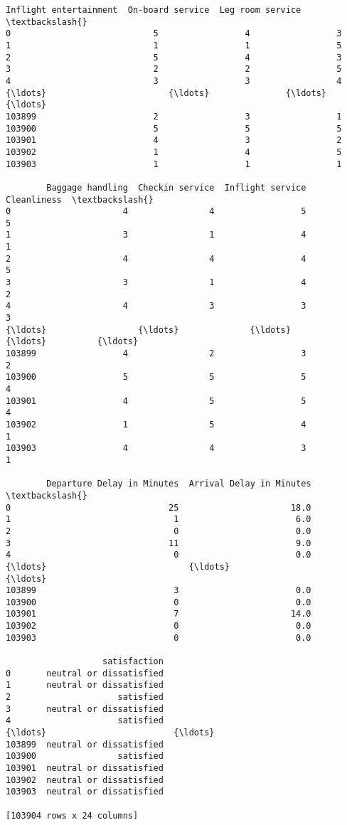 \documentclass[11pt]{article}
\begin{document}
\begin{tcolorbox}[breakable, size=fbox, boxrule=.5pt, pad at break*=1mm, opacityfill=0]
\begin{Verbatim}[commandchars=\\\{\}]
        Inflight entertainment  On-board service  Leg room service  \textbackslash{}
0                            5                 4                 3
1                            1                 1                 5
2                            5                 4                 3
3                            2                 2                 5
4                            3                 3                 4
{\ldots}                        {\ldots}               {\ldots}               {\ldots}
103899                       2                 3                 1
103900                       5                 5                 5
103901                       4                 3                 2
103902                       1                 4                 5
103903                       1                 1                 1

        Baggage handling  Checkin service  Inflight service  Cleanliness  \textbackslash{}
0                      4                4                 5            5
1                      3                1                 4            1
2                      4                4                 4            5
3                      3                1                 4            2
4                      4                3                 3            3
{\ldots}                  {\ldots}              {\ldots}               {\ldots}          {\ldots}
103899                 4                2                 3            2
103900                 5                5                 5            4
103901                 4                5                 5            4
103902                 1                5                 4            1
103903                 4                4                 3            1

        Departure Delay in Minutes  Arrival Delay in Minutes  \textbackslash{}
0                               25                      18.0
1                                1                       6.0
2                                0                       0.0
3                               11                       9.0
4                                0                       0.0
{\ldots}                            {\ldots}                       {\ldots}
103899                           3                       0.0
103900                           0                       0.0
103901                           7                      14.0
103902                           0                       0.0
103903                           0                       0.0

                   satisfaction
0       neutral or dissatisfied
1       neutral or dissatisfied
2                     satisfied
3       neutral or dissatisfied
4                     satisfied
{\ldots}                         {\ldots}
103899  neutral or dissatisfied
103900                satisfied
103901  neutral or dissatisfied
103902  neutral or dissatisfied
103903  neutral or dissatisfied

[103904 rows x 24 columns]
\end{Verbatim}
\end{tcolorbox}
        
\end{document}
